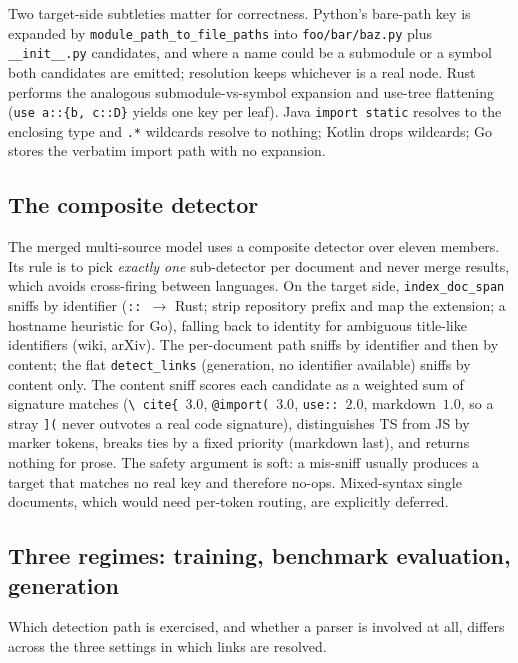 Two target-side subtleties matter for correctness. Python's bare-path key is
expanded by \texttt{module\_path\_to\_file\_paths} into \texttt{foo/bar/baz.py} plus
\texttt{\_\_init\_\_.py} candidates, and where a name could be a submodule or a
symbol both candidates are emitted; resolution keeps whichever is a real node. Rust
performs the analogous submodule-vs-symbol expansion and use-tree flattening
(\texttt{use a::\{b, c::D\}} yields one key per leaf). Java \texttt{import static}
resolves to the enclosing type and \texttt{.*} wildcards resolve to nothing; Kotlin
drops wildcards; Go stores the verbatim import path with no expansion.

\subsection{The composite detector}

The merged multi-source model uses a composite detector over eleven members. Its
rule is to pick \emph{exactly one} sub-detector per document and never merge
results, which avoids cross-firing between languages. On the target side,
\texttt{index\_doc\_span} sniffs by identifier (\texttt{::}~$\to$ Rust; strip
repository prefix and map the extension; a hostname heuristic for Go), falling back
to identity for ambiguous title-like identifiers (wiki, arXiv). The per-document
path sniffs by identifier and then by content; the flat \texttt{detect\_links}
(generation, no identifier available) sniffs by content only. The content sniff
scores each candidate as a weighted sum of signature matches (\texttt{\textbackslash
cite\{}~$3.0$, \texttt{@import(}~$3.0$, \texttt{use::}~$2.0$, markdown~$1.0$, so a
stray \texttt{](} never outvotes a real code signature), distinguishes TS from JS by
marker tokens, breaks ties by a fixed priority (markdown last), and returns nothing
for prose. The safety argument is soft: a mis-sniff usually produces a target that
matches no real key and therefore no-ops. Mixed-syntax single documents, which would
need per-token routing, are explicitly deferred.

\subsection{Three regimes: training, benchmark evaluation, generation}
\label{app:linkdet:regimes}

Which detection path is exercised, and whether a parser is involved at all, differs
across the three settings in which links are resolved.


